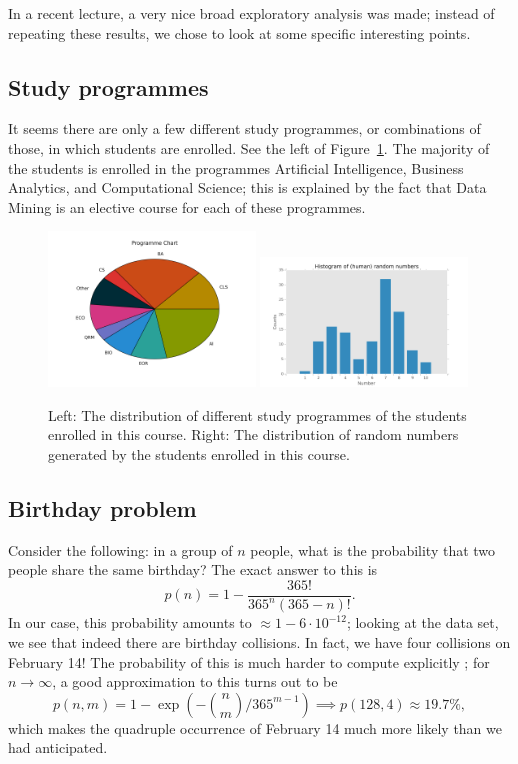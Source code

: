 \documentclass[runningheads,a4paper]{llncs}
\begin{document}
In a recent lecture,\cite{lecture2DataMining} a very nice broad exploratory analysis was made; instead of repeating these results, we chose to look at some specific interesting points.

\subsection{Study programmes}

It seems there are only a few different study programmes, or combinations of those, in which students are enrolled. See the left of Figure~\ref{fig:studies}.  The majority of the students is enrolled in the programmes Artificial Intelligence, Business Analytics, and Computational Science; this is explained by the fact that Data Mining is an elective course for each of these programmes.  

\begin{figure}[t]
\centering
  \includegraphics[width=0.49\textwidth]{programme_pie}
  \includegraphics[width=0.49\textwidth]{random_human_nums}
  \caption{Left: The distribution of different study programmes of the students enrolled in this course. Right: The distribution of random numbers generated by the students enrolled in this course. }
  \label{fig:studies}
\end{figure}

\subsection{Birthday problem}
Consider the following: in a group of $n$ people, what is the probability that two people share the same birthday? The exact answer\cite{wiki:birthday}	 to this is
\[
 p(n) = 1 - \frac{365!}{365^n (365-n)!}.
\]
In our case, this probability amounts to $\approx 1 - 6 \cdot 10^{-12}$; looking at the data set, we see that indeed there are birthday collisions. In fact, we have four collisions on February 14! The probability of this is much harder to compute explicitly \cite{birthday}; for $n \to \infty$, a good approximation to this turns out to be
\[
 p(n, m) = 1 - \exp\left(-{n \choose m} / 365^{m-1}\right) \implies p(128, 4) \approx 19.7\%,
\]
which makes the quadruple occurrence of February 14 much more likely than we had anticipated.
\end{document}
